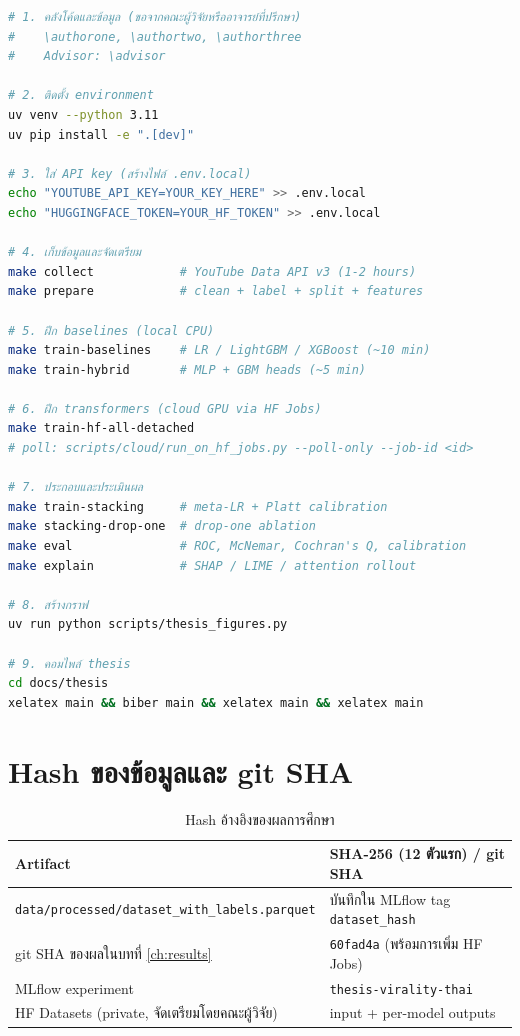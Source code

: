 \begin{lstlisting}[language=bash,caption={ขั้นตอนการ reproduce ทั้งหมด}]
# 1. คลังโค้ดและข้อมูล (ขอจากคณะผู้วิจัยหรืออาจารย์ที่ปรึกษา)
#    \authorone, \authortwo, \authorthree
#    Advisor: \advisor

# 2. ติดตั้ง environment
uv venv --python 3.11
uv pip install -e ".[dev]"

# 3. ใส่ API key (สร้างไฟล์ .env.local)
echo "YOUTUBE_API_KEY=YOUR_KEY_HERE" >> .env.local
echo "HUGGINGFACE_TOKEN=YOUR_HF_TOKEN" >> .env.local

# 4. เก็บข้อมูลและจัดเตรียม
make collect            # YouTube Data API v3 (1-2 hours)
make prepare            # clean + label + split + features

# 5. ฝึก baselines (local CPU)
make train-baselines    # LR / LightGBM / XGBoost (~10 min)
make train-hybrid       # MLP + GBM heads (~5 min)

# 6. ฝึก transformers (cloud GPU via HF Jobs)
make train-hf-all-detached
# poll: scripts/cloud/run_on_hf_jobs.py --poll-only --job-id <id>

# 7. ประกอบและประเมินผล
make train-stacking     # meta-LR + Platt calibration
make stacking-drop-one  # drop-one ablation
make eval               # ROC, McNemar, Cochran's Q, calibration
make explain            # SHAP / LIME / attention rollout

# 8. สร้างกราฟ
uv run python scripts/thesis_figures.py

# 9. คอมไพล์ thesis
cd docs/thesis
xelatex main && biber main && xelatex main && xelatex main
\end{lstlisting}

\section{Hash ของข้อมูลและ git SHA}

\begin{table}[H]
\centering
\caption{Hash อ้างอิงของผลการศึกษา}
\begin{tabularx}{\textwidth}{lX}
\toprule
\textbf{Artifact} & \textbf{SHA-256 (12 ตัวแรก) / git SHA} \\
\midrule
\texttt{data/processed/dataset\_with\_labels.parquet} & บันทึกใน MLflow tag \texttt{dataset\_hash} \\
git SHA ของผลในบทที่ \ref{ch:results}                  & \texttt{60fad4a} (พร้อมการเพิ่ม HF Jobs) \\
MLflow experiment                                      & \texttt{thesis-virality-thai} \\
HF Datasets (private, จัดเตรียมโดยคณะผู้วิจัย)         & input + per-model outputs \\
\bottomrule
\end{tabularx}
\end{table}

